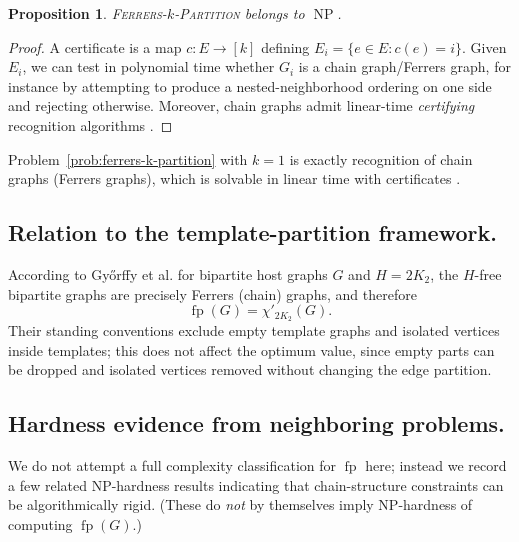 \documentclass[12pt]{amsart}
\newtheorem{proposition}{Proposition}
\newcommand{\fp}{\operatorname{fp}}
\newcommand{\NP}{\operatorname{NP}}
\begin{document}
\begin{proposition}\label{prop:fp-in-NP}
\textsc{Ferrers-$k$-Partition} belongs to $\NP$.
\end{proposition}

\begin{proof}
A certificate is a map $c:E\to[k]$ defining $E_i=\{e\in E: c(e)=i\}$.
Given $E_i$, we can test in polynomial time whether $G_i$ is a chain graph/Ferrers graph,
for instance by attempting to produce a nested-neighborhood ordering on one side and rejecting otherwise.
Moreover, chain graphs admit linear-time \emph{certifying} recognition algorithms \cite{HeggernesKratsch2007}.
\end{proof}

Problem~\ref{prob:ferrers-k-partition} with $k=1$ is exactly recognition of chain graphs (Ferrers graphs), which is solvable in linear time with certificates \cite{HeggernesKratsch2007}.
\\

\subsection{Relation to the template-partition framework.}
According to Gy\H{o}rffy et al. for bipartite host graphs $G$ and $H=2K_2$, the $H$-free bipartite graphs are precisely Ferrers (chain) graphs,
and therefore
\[
\fp(G)=\chi'_{2K_2}(G).
\]
Their standing conventions exclude empty template graphs and isolated vertices inside templates;
this does not affect the optimum value, since empty parts can be dropped and isolated vertices removed without changing the edge partition. \cite{GyorffyLondonNagyPluhar2025}



\subsection{Hardness evidence from neighboring problems.}
We do not attempt a full complexity classification for $\fp$ here; instead we record a few related NP-hardness
results indicating that chain-structure constraints can be algorithmically rigid.
(These do \emph{not} by themselves imply NP-hardness of computing $\fp(G)$.)
\end{document}
